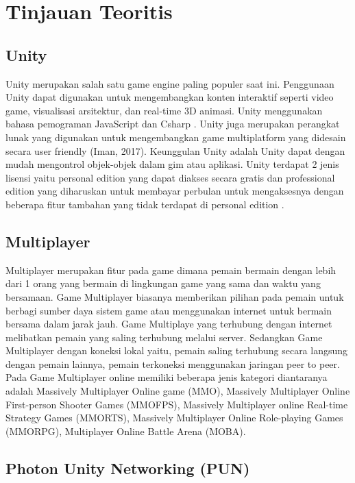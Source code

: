 \section{Tinjauan Teoritis}
\subsection{Unity}
\noindent

Unity merupakan salah satu game engine paling populer saat ini. Penggunaan Unity dapat digunakan untuk mengembangkan konten interaktif seperti video game, 
visualisasi arsitektur, dan real-time 3D animasi. Unity menggunakan bahasa pemograman JavaScript dan 
Csharp \cite{Ansori}. Unity juga merupakan perangkat lunak yang digunakan untuk mengembangkan game multiplatform yang didesain secara user friendly 
(Iman, 2017). Keunggulan Unity adalah Unity 
dapat dengan mudah mengontrol objek-objek 
dalam gim atau aplikasi. Unity terdapat 2 jenis 
lisensi yaitu personal edition yang dapat diakses 
secara gratis dan professional edition yang 
diharuskan untuk membayar perbulan untuk 
mengaksesnya dengan beberapa fitur tambahan 
yang tidak terdapat di personal edition \cite{Sarwodi}. 

\subsection{Multiplayer}
\noindent

Multiplayer merupakan fitur pada game dimana pemain bermain dengan lebih dari 1 orang yang bermain 
di lingkungan game yang sama dan waktu yang bersamaan. Game Multiplayer biasanya memberikan pilihan pada 
pemain untuk berbagi sumber daya sistem game atau menggunakan internet untuk bermain bersama dalam jarak 
jauh. Game Multiplaye yang terhubung dengan internet melibatkan pemain yang saling terhubung melalui server. 
Sedangkan Game Multiplayer dengan koneksi lokal yaitu, pemain saling terhubung secara langsung dengan 
pemain lainnya, pemain terkoneksi menggunakan jaringan peer to peer. Pada Game Multiplayer online memiliki 
beberapa jenis kategori diantaranya adalah Massively Multiplayer Online game (MMO), Massively Multiplayer 
Online First-person Shooter Games (MMOFPS), Massively Multiplayer online Real-time Strategy Games
(MMORTS), Massively Multiplayer Online Role-playing Games (MMORPG), Multiplayer Online Battle Arena
(MOBA)\cite{Ansori}.

\subsection{Photon Unity Networking (PUN)}
\noindent

